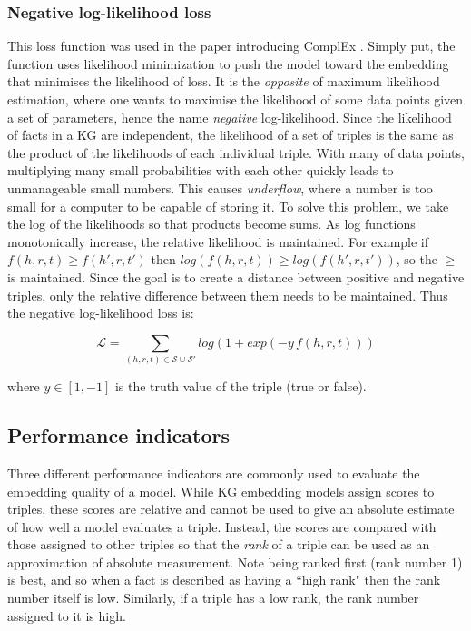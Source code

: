 \subsubsection{Negative log-likelihood loss}
This loss function was used in the paper introducing ComplEx \cite{complEx}. Simply put, the function uses likelihood minimization to push the model toward the embedding that minimises the likelihood of loss. It is the \textit{opposite} of maximum likelihood estimation, where one wants to maximise the likelihood of some data points given a set of parameters, hence the name \textit{negative} log-likelihood.
Since the likelihood of facts in a KG are independent, the likelihood of a set of triples is the same as the product of the likelihoods of each individual triple. With many of data points, multiplying many small probabilities with each other quickly leads to unmanageable small numbers. This causes \textit{underflow}, where a number is too small for a computer to be capable of storing it. To solve this problem, we take the log of the likelihoods so that products become sums. As log functions monotonically increase, the relative likelihood is maintained. For example if $f(h,r,t) \geq f(h', r, t')$ then $log(f(h,r,t)) \geq log(f(h', r, t'))$, so the $\geq$ is maintained. Since the goal is to create a distance between positive and negative triples, only the relative difference between them needs to be maintained. Thus the negative log-likelihood loss is:

\[\mathcal{L}=\sum_{(h, r, t) \in \mathcal{S} \cup \mathcal{S'}}log(1+exp(-y \, f(h, r, t)))\]

where $y\in [1, -1]$ is the truth value of the triple (true or false).



    
\subsection{Performance indicators}
\label{Performance_indicators}
Three different performance indicators are commonly used to evaluate the embedding quality of a model. While KG embedding models assign scores to triples, these scores are relative and cannot be used to give an absolute estimate of how well a model evaluates a triple. Instead, the scores are compared with those assigned to other triples so that the \textit{rank} of a triple can be used as an approximation of absolute measurement. Note being ranked first (rank number 1) is best, and so when a fact is described as having a ``high rank" then the rank number itself is low. Similarly, if a triple has a low rank, the rank number assigned to it is high.

